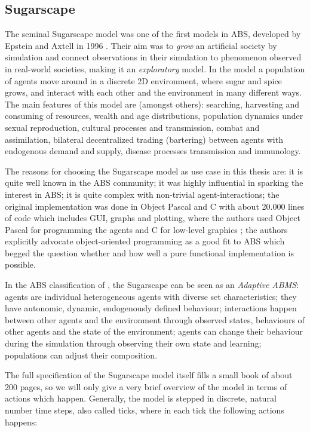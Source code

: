 \subsection{Sugarscape}
\label{sec:sugarscape}

The seminal Sugarscape model was one of the first models in ABS, developed by Epstein and Axtell in 1996 \cite{epstein_growing_1996}. Their aim was to \textit{grow} an artificial society by simulation and connect observations in their simulation to phenomenon observed in real-world societies, making it an \textit{exploratory} model. In the model a population of agents move around in a discrete 2D environment, where sugar and spice grows, and interact with each other and the environment in many different ways. The main features of this model are (amongst others): searching, harvesting and consuming of resources, wealth and age distributions, population dynamics under sexual reproduction, cultural processes and transmission, combat and assimilation, bilateral decentralized trading (bartering) between agents with endogenous demand and supply, disease processes transmission and immunology.

The reasons for choosing the Sugarscape model as use case in this thesis are: it is quite well known in the ABS community; it was highly influential in sparking the interest in ABS; it is quite complex with non-trivial agent-interactions; the original implementation was done in Object Pascal and C with about 20.000 lines of code which includes GUI, graphs and plotting, where the authors used Object Pascal for programming the agents and C for low-level graphics \cite{axtell_aligning_1996}; the authors explicitly advocate object-oriented programming as a good fit to ABS which begged the question whether and how well a pure functional implementation is possible. 

In the ABS classification of \cite{macal_everything_2016}, the Sugarscape can be seen as an \textit{Adaptive ABMS}: agents are individual heterogeneous agents with diverse set characteristics; they have autonomic, dynamic, endogenously defined behaviour; interactions happen between other agents and the environment through observed states, behaviours of other agents and the state of the environment; agents can change their behaviour during the simulation through observing their own state and learning; populations can adjust their composition.

The full specification of the Sugarscape model itself fills a small book \cite{epstein_growing_1996} of about 200 pages, so we will only give a very brief overview of the model in terms of actions which happen. Generally, the model is stepped in discrete, natural number time steps, also called ticks, where in each tick the following actions happens:

